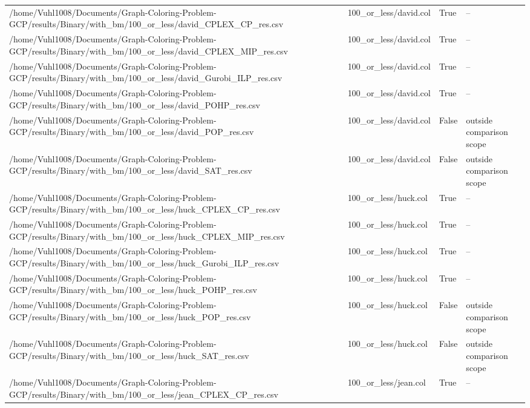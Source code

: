\begin{table}[htbp]
\begin{tabular}{llll}
/home/Vuhl1008/Documents/Graph-Coloring-Problem-GCP/results/Binary/with\_bm/100\_or\_less/david\_CPLEX\_CP\_res.csv & 100\_or\_less/david.col & True & -- \\
/home/Vuhl1008/Documents/Graph-Coloring-Problem-GCP/results/Binary/with\_bm/100\_or\_less/david\_CPLEX\_MIP\_res.csv & 100\_or\_less/david.col & True & -- \\
/home/Vuhl1008/Documents/Graph-Coloring-Problem-GCP/results/Binary/with\_bm/100\_or\_less/david\_Gurobi\_ILP\_res.csv & 100\_or\_less/david.col & True & -- \\
/home/Vuhl1008/Documents/Graph-Coloring-Problem-GCP/results/Binary/with\_bm/100\_or\_less/david\_POHP\_res.csv & 100\_or\_less/david.col & True & -- \\
/home/Vuhl1008/Documents/Graph-Coloring-Problem-GCP/results/Binary/with\_bm/100\_or\_less/david\_POP\_res.csv & 100\_or\_less/david.col & False & outside comparison scope \\
/home/Vuhl1008/Documents/Graph-Coloring-Problem-GCP/results/Binary/with\_bm/100\_or\_less/david\_SAT\_res.csv & 100\_or\_less/david.col & False & outside comparison scope \\
/home/Vuhl1008/Documents/Graph-Coloring-Problem-GCP/results/Binary/with\_bm/100\_or\_less/huck\_CPLEX\_CP\_res.csv & 100\_or\_less/huck.col & True & -- \\
/home/Vuhl1008/Documents/Graph-Coloring-Problem-GCP/results/Binary/with\_bm/100\_or\_less/huck\_CPLEX\_MIP\_res.csv & 100\_or\_less/huck.col & True & -- \\
/home/Vuhl1008/Documents/Graph-Coloring-Problem-GCP/results/Binary/with\_bm/100\_or\_less/huck\_Gurobi\_ILP\_res.csv & 100\_or\_less/huck.col & True & -- \\
/home/Vuhl1008/Documents/Graph-Coloring-Problem-GCP/results/Binary/with\_bm/100\_or\_less/huck\_POHP\_res.csv & 100\_or\_less/huck.col & True & -- \\
/home/Vuhl1008/Documents/Graph-Coloring-Problem-GCP/results/Binary/with\_bm/100\_or\_less/huck\_POP\_res.csv & 100\_or\_less/huck.col & False & outside comparison scope \\
/home/Vuhl1008/Documents/Graph-Coloring-Problem-GCP/results/Binary/with\_bm/100\_or\_less/huck\_SAT\_res.csv & 100\_or\_less/huck.col & False & outside comparison scope \\
/home/Vuhl1008/Documents/Graph-Coloring-Problem-GCP/results/Binary/with\_bm/100\_or\_less/jean\_CPLEX\_CP\_res.csv & 100\_or\_less/jean.col & True & -- \\

\end{tabular}
\end{table}
